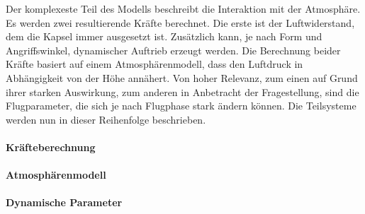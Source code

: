Der komplexeste Teil des Modells beschreibt die Interaktion mit der Atmosphäre. Es werden zwei resultierende Kräfte berechnet. Die erste ist der Luftwiderstand, dem die Kapsel immer ausgesetzt ist. Zusätzlich kann, je nach Form und Angriffswinkel, dynamischer Auftrieb erzeugt werden. Die Berechnung beider Kräfte basiert auf einem Atmosphärenmodell, dass den Luftdruck in Abhängigkeit von der Höhe annähert. Von hoher Relevanz, zum einen auf Grund ihrer starken Auswirkung, zum anderen in Anbetracht der Fragestellung, sind die Flugparameter, die sich je nach Flugphase stark ändern können. Die Teilsysteme werden nun in dieser Reihenfolge beschrieben.

\paragraph{Kräfteberechnung}
\label{par:atmosphere}


\paragraph{Atmosphärenmodell}


\paragraph{Dynamische Parameter}
